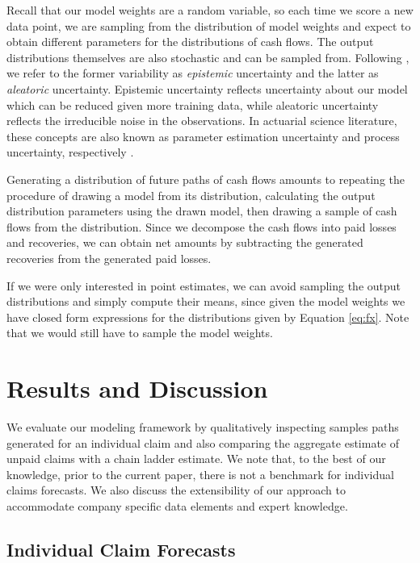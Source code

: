 \documentclass{article}
\begin{document}
Recall that our model weights are a random variable, so each time we score a new data point, we are sampling from the distribution of model weights and expect to obtain different parameters for the distributions of cash flows. The output distributions themselves are also stochastic and can be sampled from. Following \cite{kendallWhatUncertainties2017}, we refer to the former variability as \textit{epistemic} uncertainty and the latter as \textit{aleatoric} uncertainty. Epistemic uncertainty reflects uncertainty about our model which can be reduced given more training data, while aleatoric uncertainty reflects the irreducible noise in the observations. In actuarial science literature, these concepts are also known as parameter estimation uncertainty and process uncertainty, respectively \cite{wuthrichNonlifeInsurance2017}.

Generating a distribution of future paths of cash flows amounts to repeating the procedure of drawing a model from its distribution, calculating the output distribution parameters using the drawn model, then drawing a sample of cash flows from the distribution. Since we decompose the cash flows into paid losses and recoveries, we can obtain net amounts by subtracting the generated recoveries from the generated paid losses.

If we were only interested in point estimates, we can avoid sampling the output distributions and simply compute their means, since given the model weights we have closed form expressions for the distributions given by Equation \ref{eq:fx}. Note that we would still have to sample the model weights.

\section {Results and Discussion}

We evaluate our modeling framework by qualitatively inspecting samples paths generated for an individual claim and also comparing the aggregate estimate of unpaid claims with a chain ladder estimate. We note that, to the best of our knowledge, prior to the current paper, there is not a benchmark for individual claims forecasts. We also discuss the extensibility of our approach to accommodate company specific data elements and expert knowledge.

\subsection{Individual Claim Forecasts}
\end{document}
